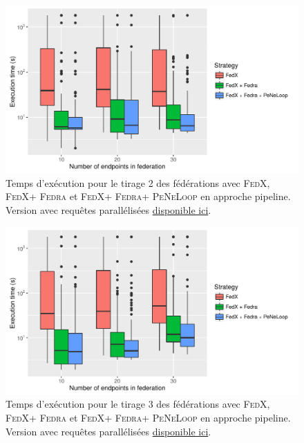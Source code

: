 \documentclass[a4paper]{article}
\def\fedra{\textsc{Fedra}\xspace}
\def\fedx{\textsc{FedX}\xspace}
\def\peneloop{\textsc{PeNeLoop}\xspace}
\newcommand{\parallelLink}[1]{Version avec requêtes parallélisées \href{#1}{disponible ici}.}
\begin{document}
\begin{figure}[h]
    \centering
    \includegraphics{boxplots/fed2_execution_time.pdf}
    \caption{Temps d'exécution pour le tirage 2 des fédérations avec \fedx, \fedx + \fedra et \fedx + \fedra + \peneloop en approche pipeline. \parallelLink{https://github.com/Callidon/ParallelNestedLoop/blob/master/results/definitive/fed2_pll_execution_time.pdf}}
    \label{fig:fed2_time}
\end{figure}

\begin{figure}[h]
    \centering
    \includegraphics{boxplots/fed3_execution_time.pdf}
    \caption{Temps d'exécution pour le tirage 3 des fédérations avec \fedx, \fedx + \fedra et \fedx + \fedra + \peneloop en approche pipeline. \parallelLink{https://github.com/Callidon/ParallelNestedLoop/blob/master/results/definitive/fed3_pll_execution_time.pdf}}
    \label{fig:fed3_time}
\end{figure}
\end{document}
